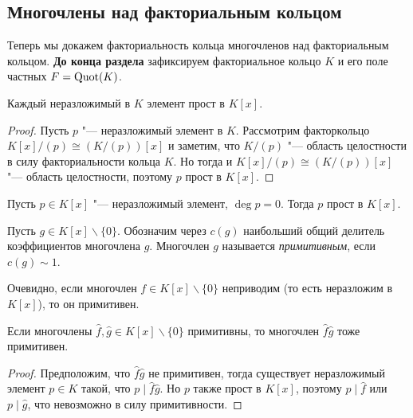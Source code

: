 \subsection{Многочлены над факториальным кольцом}

Теперь мы докажем факториальность кольца многочленов над факториальным кольцом. \textbf{До конца раздела} зафиксируем факториальное кольцо $K$ и его поле частных $F = \operatorname{Quot}(K)$.

\begin{proposition}
	Каждый неразложимый в $K$ элемент прост в $K[x]$.
\end{proposition}

\begin{proof}
	Пусть $p$ "--- неразложимый элемент в $K$. Рассмотрим факторкольцо $K[x] / (p) \cong (K / (p))[x]$ и заметим, что $K / (p)$ "--- область целостности в силу факториальности кольца $K$. Но тогда и $K[x] / (p) \cong (K / (p))[x]$ "--- область целостности, поэтому $p$ прост в $K[x]$.
\end{proof}

\begin{corollary}
	Пусть $p \in K[x]$ "--- неразложимый элемент, $\deg{p} = 0$. Тогда $p$ прост в $K[x]$.
\end{corollary}

\begin{definition}
	Пусть $g \in K[x] \backslash \{0\}$. Обозначим через $c(g)$ наибольший общий делитель коэффициентов многочлена $g$. Многочлен $g$ называется \textit{примитивным}, если $c(g) \sim 1$.
\end{definition}

\begin{note}
	Очевидно, если многочлен $f \in K[x] \backslash \{0\}$ неприводим (то есть неразложим в $K[x]$), то он примитивен.
\end{note}

\begin{proposition}
	Если многочлены $\widehat{f}, \widehat{g} \in K[x] \backslash \{0\}$ примитивны, то многочлен $\widehat{f}\widehat{g}$ тоже примитивен.
\end{proposition}

\begin{proof}
	Предположим, что $\widehat{f}\widehat{g}$ не примитивен, тогда существует неразложимый элемент $p \in K$ такой, что $p \mid \widehat{f}\widehat{g}$. Но $p$ также прост в $K[x]$, поэтому $p \mid \widehat{f}$ или $p \mid \widehat{g}$, что невозможно в силу примитивности.
\end{proof}

